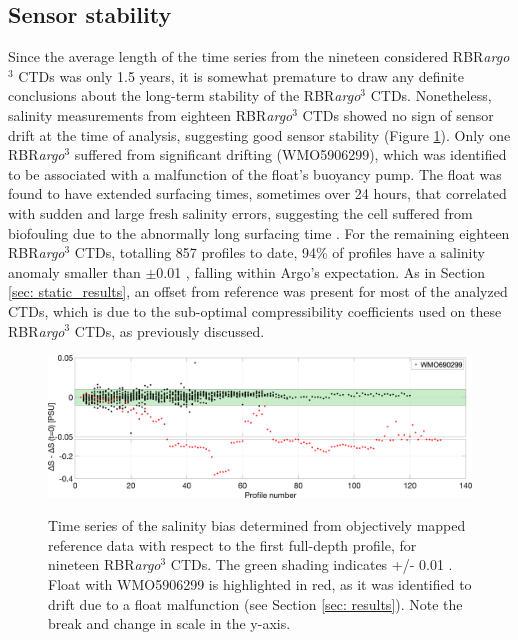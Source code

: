 \documentclass{ametsocV6.1}
\begin{document}
\subsection{Sensor stability}
Since the average length of the time series from the nineteen considered RBR\textit{argo}$^3$ CTDs was only 1.5 years, it is somewhat premature to draw any definite conclusions about the long-term stability of the RBR\textit{argo}$^3$ CTDs. 
Nonetheless, salinity measurements from eighteen RBR\textit{argo}$^3$ CTDs showed no sign of sensor drift at the time of analysis, suggesting good sensor stability (Figure \ref{fig: stability}). 
Only one RBR\textit{argo}$^3$ suffered from significant drifting (WMO5906299), which was identified to be associated with a malfunction of the float's buoyancy pump. 
The float was found to have extended surfacing times, sometimes over 24 hours,  that correlated with sudden and large fresh salinity errors, suggesting the cell suffered from biofouling due to the abnormally long surfacing time \citep{RBRdrift}.
For the remaining eighteen RBR\textit{argo}$^3$ CTDs,  totalling 857 profiles to date, 94\% of profiles have a salinity anomaly smaller than $\pm$0.01 , falling within Argo's expectation.  
As in Section \ref{sec: static_results}, an offset from reference was present for most of the analyzed CTDs, which is due to the sub-optimal compressibility coefficients used on these RBR\textit{argo}$^3$ CTDs, as previously discussed.

\begin{figure}[t]
	\includegraphics[width = \linewidth]{Fig6_stability}\\
	\caption{Time series of the salinity bias determined from objectively mapped reference data \citep{Owens_2009} with respect to the first full-depth profile,  for nineteen RBR\textit{argo}$^3$ CTDs. The green shading indicates +/- 0.01 . Float with WMO5906299 is highlighted in red, as it was identified to drift due to a float malfunction (see Section \ref{sec: results}). Note the break and change in scale in the y-axis.}
	\label{fig: stability}
\end{figure}
\end{document}

